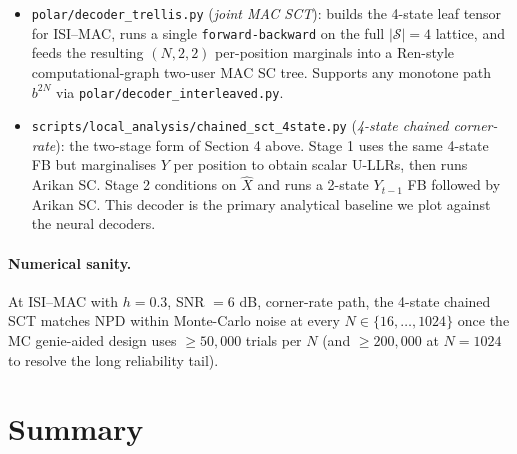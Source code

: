 \documentclass[11pt]{article}
\newcommand{\bbY}{Y}
\newcommand{\bbX}{X}
\begin{document}
\begin{itemize}[leftmargin=*]
\item \texttt{polar/decoder\_trellis.py} (\emph{joint MAC SCT}): builds the
  4-state leaf tensor for ISI--MAC, runs a single \texttt{forward-backward}
  on the full $|\mathcal{S}|=4$ lattice, and feeds the resulting
  $(N,2,2)$ per-position marginals into a Ren-style computational-graph
  two-user MAC SC tree.  Supports any monotone path $b^{2N}$ via
  \texttt{polar/decoder\_interleaved.py}.

\item \texttt{scripts/local\_analysis/chained\_sct\_4state.py} (\emph{4-state
  chained corner-rate}): the two-stage form of Section 4 above.  Stage 1
  uses the same 4-state FB but marginalises $\bbY$ per position to obtain
  scalar U-LLRs, then runs Arikan SC.  Stage 2 conditions on $\hat{\bbX}$
  and runs a 2-state $Y_{t-1}$ FB followed by Arikan SC.  This decoder is
  the primary analytical baseline we plot against the neural decoders.
\end{itemize}

\paragraph{Numerical sanity.}  At ISI--MAC with $h=0.3$, SNR $=6$ dB,
corner-rate path, the 4-state chained SCT matches NPD within
Monte-Carlo noise at every $N\in\{16,\ldots,1024\}$ once the MC
genie-aided design uses $\ge 50{,}000$ trials per $N$ (and
$\ge 200{,}000$ at $N=1024$ to resolve the long reliability tail).

\section{Summary}
\end{document}
